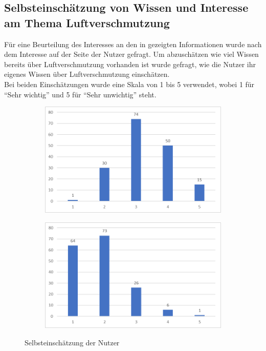 \subsection{Selbsteinschätzung von Wissen und Interesse am Thema Luftverschmutzung}
Für eine Beurteilung des Interesses an den in \softwarename gezeigten Informationen wurde nach dem Interesse auf der Seite der Nutzer gefragt.
Um abzuschätzen wie viel Wissen bereits über \gls{Luftverschmutzung} vorhanden ist wurde gefragt, wie die Nutzer ihr eigenes Wissen über \gls{Luftverschmutzung} einschätzen.
\\
Bei beiden Einschätzungen wurde eine Skala von 1 bis 5 verwendet, wobei 1 für \enquote{Sehr wichtig} und 5 für \enquote{Sehr unwichtig} steht.
\\
\begin{figure}[h]
    \begin{subfigure}[c]{0.49\textwidth}
        \centering        
        \includegraphics[scale=0.2]{media/diagram/eigenesWissen.png}
    \end{subfigure}
    \begin{subfigure}[c]{0.49\textwidth}
        \centering        
        \includegraphics[scale=0.2]{media/diagram/WichtigkeitVonInfos.png}
    \end{subfigure}
    \caption{Selbsteinschätzung der Nutzer}
\end{figure}
